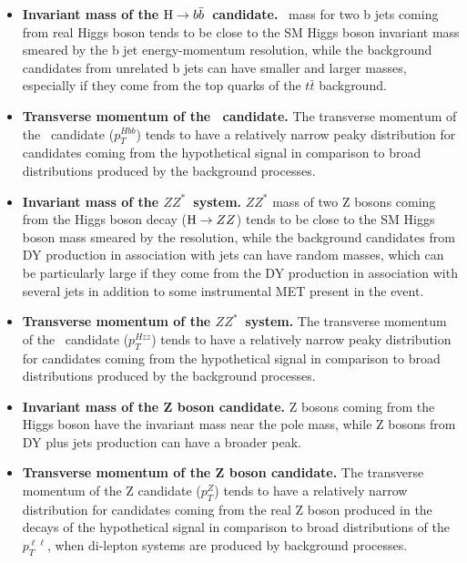 \begin{small}
\begin{itemize}
\item{\bfseries Invariant mass of the $\mathrm{H}\to b\bar{b}$~candidate.} 
\HBB~mass for two b jets coming from real Higgs boson tends to be close to the SM Higgs boson invariant mass smeared by the b jet energy-momentum resolution, while the background candidates from unrelated b jets can have smaller and larger masses, especially if they come from the top quarks of the $t\bar{t}$ background.
           
\item{\bfseries Transverse momentum of the \HBB~candidate.} 
The transverse momentum of the \HBB~candidate ($p_T^{Hbb}$) tends to have a relatively narrow peaky distribution for candidates coming from the hypothetical signal in comparison to broad distributions produced by the background processes. 

\item{\bfseries Invariant mass of the $ZZ^*$~system.} 
$ZZ^*$ mass of two Z bosons coming from the Higgs boson decay ($\mathrm{H}\rightarrow ZZ$) tends to be close to the SM Higgs boson mass smeared by the \PTslash resolution, while the background candidates from DY production in association with jets can have random masses, which can be particularly large if they come from the DY production in association with several jets in addition to some instrumental MET present in the event.

\item{\bfseries Transverse momentum of the $ZZ^*$~system.} 
The transverse momentum of the \HZZ~candidate ($p_T^{Hzz}$) tends to have a relatively narrow peaky distribution for candidates coming from the hypothetical signal in comparison to broad distributions produced by the background processes. 

\item{\bfseries Invariant mass of the Z boson candidate.} 
Z bosons coming from the Higgs boson have the invariant mass near the pole mass, while Z bosons from DY plus jets production can have a broader peak.

\item{\bfseries Transverse momentum of the Z boson candidate.} 
The transverse momentum of the Z candidate ($p_T^Z$) tends to have a relatively narrow distribution for candidates coming from the real Z boson produced in the decays of the hypothetical signal in comparison to broad distributions of the $p_T^{\ell\ell}$, when di-lepton systems are produced by background processes. 

\end{itemize}
           

\end{small}
